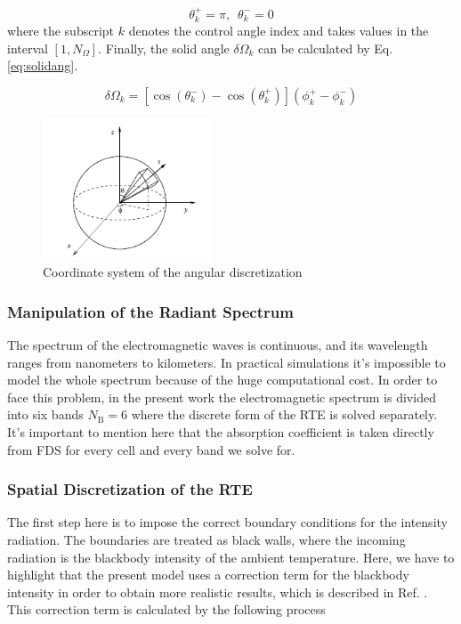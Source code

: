 \documentclass{warpdoc}
\begin{document}
 \begin{equation}
     \theta_k^+=\pi,\enspace \theta_k^-=0 \label{eq:angdisc2}
 \end{equation}
where the subscript $k$ denotes the control angle index and takes values in the interval $[1,N_{\Omega}]$. Finally, the solid angle $\delta{\Omega}_k$ can be calculated by Eq. \eqref{eq:solidang}.

\begin{equation}
    \delta{\Omega}_k=[\cos(\theta_k^-)-\cos(\theta_k^+)](\phi_k^+-\phi_k^-)
     \label{eq:solidang}
\end{equation}

\begin{figure}[!h]
\centering
\includegraphics[width=0.45\textwidth]{angular_disc.png}
\caption{Coordinate system of the angular discretization}
\label{fig:ang}
\end{figure}
\subsubsection{Manipulation of the Radiant Spectrum}
The spectrum of the electromagnetic waves is continuous, and its wavelength ranges from nanometers to kilometers. In practical simulations it's impossible to model the whole spectrum because of the huge computational cost. In order to face this problem, in the present work the electromagnetic spectrum is divided into six bands $N_\text{B}=6$ where the discrete form of the RTE is solved separately. It's important to mention here that the absorption coefficient is taken directly from FDS for every cell and every band we solve for. 
\subsubsection{Spatial Discretization of the RTE}
The first step here is to impose the correct boundary conditions for the intensity radiation. The boundaries are treated as black walls, where the incoming radiation is the blackbody intensity of the ambient temperature. Here, we have to highlight that the present model uses a correction term for the blackbody intensity in order to obtain more realistic results, which is described in Ref. \cite{ref67}. This correction term is calculated by the following process 
\end{document}
